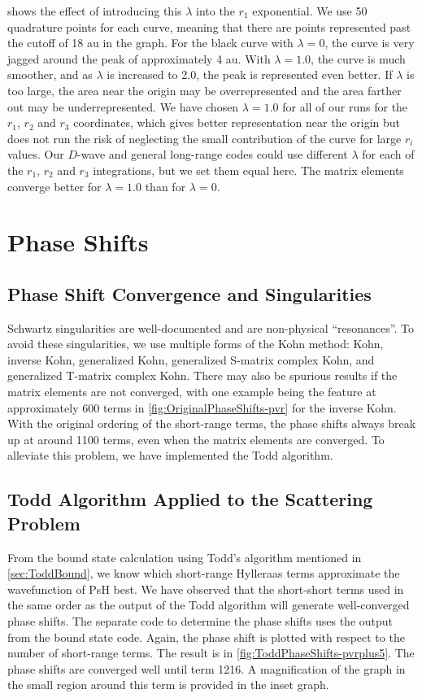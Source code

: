 \documentclass[Dissertation.tex]{subfiles}
\begin{document}
 shows the effect of introducing this $\lambda$ into the $r_1$
exponential. We use 50 quadrature points for each curve, meaning that there 
are points represented past the cutoff of 18 au in the graph. For the black 
curve with $\lambda = 0$, the curve is very jagged around the peak of 
approximately 4 au. With $\lambda = 1.0$, the curve is much smoother, and as
$\lambda$ is increased to 2.0, the peak is represented even better. If $\lambda$
is too large, the area near the origin may be overrepresented and the area 
farther out may be underrepresented. We have chosen $\lambda = 1.0$ for all 
of our runs for the $r_1$, $r_2$ and $r_3$ coordinates, which gives better
representation near the origin but does not  run the risk of neglecting the
small contribution of the curve for large $r_i$ values. Our $D$-wave and
general long-range codes could use different $\lambda$ for each of the
$r_1$, $r_2$ and $r_3$ integrations, but we set them equal here. The matrix
elements converge better for $\lambda = 1.0$ than for $\lambda = 0$.


\section{Phase Shifts}
\label{sec:CompPhase}

\subsection{Phase Shift Convergence and Singularities}
Schwartz singularities are well-documented \cite{Lucchese1989,Cooper2009} and 
are non-physical ``resonances''. To avoid these singularities, we use 
multiple forms of the Kohn method: Kohn, inverse Kohn, generalized Kohn, 
generalized S-matrix complex Kohn, and generalized T-matrix complex Kohn. 
There may also be spurious results if the matrix elements are not converged, 
with one example being the feature at approximately 600 terms in
\cref{fig:OriginalPhaseShifts-pvr} for the inverse Kohn. With the original
ordering of the short-range terms, the phase shifts always break up at around
1100 terms, even when the matrix elements are converged. To alleviate this 
problem, we have implemented the Todd algorithm.

\subsection{Todd Algorithm Applied to the Scattering Problem}
\label{sec:ToddScattering}
From the bound state calculation using Todd's algorithm mentioned in
\cref{sec:ToddBound}, we know which short-range Hylleraas terms approximate 
the wavefunction of PsH best. We have observed that the short-short
terms used in the same order as the output of the Todd algorithm will 
generate well-converged phase shifts. The separate code to determine the 
phase shifts uses the output from the bound state code. Again, the phase 
shift is plotted with respect to the number of short-range terms. The result 
is in \cref{fig:ToddPhaseShifts-pvrplus5}. The phase shifts are 
converged well until term 1216. A magnification of the graph in the small 
region around this term is provided in the inset graph.
\end{document}
